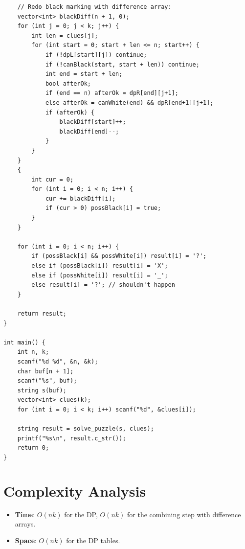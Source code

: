 \documentclass[11pt,a4paper]{article}
\begin{document}
\begin{lstlisting}
    // Redo black marking with difference array:
    vector<int> blackDiff(n + 1, 0);
    for (int j = 0; j < k; j++) {
        int len = clues[j];
        for (int start = 0; start + len <= n; start++) {
            if (!dpL[start][j]) continue;
            if (!canBlack(start, start + len)) continue;
            int end = start + len;
            bool afterOk;
            if (end == n) afterOk = dpR[end][j+1];
            else afterOk = canWhite(end) && dpR[end+1][j+1];
            if (afterOk) {
                blackDiff[start]++;
                blackDiff[end]--;
            }
        }
    }
    {
        int cur = 0;
        for (int i = 0; i < n; i++) {
            cur += blackDiff[i];
            if (cur > 0) possBlack[i] = true;
        }
    }

    for (int i = 0; i < n; i++) {
        if (possBlack[i] && possWhite[i]) result[i] = '?';
        else if (possBlack[i]) result[i] = 'X';
        else if (possWhite[i]) result[i] = '_';
        else result[i] = '?'; // shouldn't happen
    }

    return result;
}

int main() {
    int n, k;
    scanf("%d %d", &n, &k);
    char buf[n + 1];
    scanf("%s", buf);
    string s(buf);
    vector<int> clues(k);
    for (int i = 0; i < k; i++) scanf("%d", &clues[i]);

    string result = solve_puzzle(s, clues);
    printf("%s\n", result.c_str());
    return 0;
}
\end{lstlisting}

\section{Complexity Analysis}

\begin{itemize}
  \item \textbf{Time}: $O(nk)$ for the DP, $O(nk)$ for the combining step with difference arrays.
  \item \textbf{Space}: $O(nk)$ for the DP tables.
\end{itemize}
\end{document}
